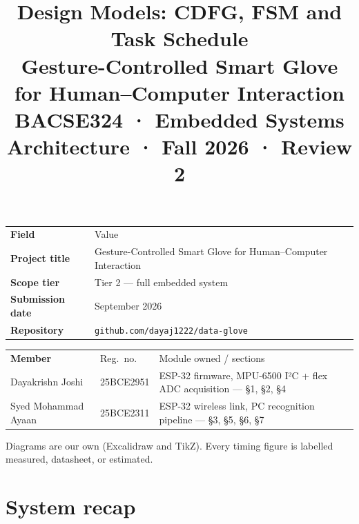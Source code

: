 \documentclass[11pt,a4paper]{article}
\title{\vspace{-1.2cm}\textbf{Design Models: CDFG, FSM and Task Schedule}\\[4pt]
\large Gesture-Controlled Smart Glove for Human–Computer Interaction\\[2pt]
\normalsize BACSE324 · Embedded Systems Architecture · Fall 2026 · Review 2}
\date{}
\newcommand{\hdrow}[1]{\rowcolor{headbg}\color{headfg}\bfseries #1}
\begin{document}
\maketitle
\vspace{-1.0cm}

\begin{tabularx}{\textwidth}{@{}>{\bfseries}p{4.2cm}X@{}}
\hdrow{Field & Value} \\[1pt]
Project title & Gesture-Controlled Smart Glove for Human–Computer Interaction \\
Scope tier & Tier 2 — full embedded system \\
Submission date & September 2026 \\
Repository & \texttt{github.com/dayaj1222/data-glove} \\
\end{tabularx}

\vspace{8pt}
\begin{tabularx}{\textwidth}{@{}p{4.2cm}p{2.6cm}X@{}}
\hdrow{Member & Reg.\ no. & Module owned / sections} \\[1pt]
Dayakrishn Joshi & 25BCE2951 & ESP-32 firmware, MPU-6500 I²C + flex ADC acquisition — §1, §2, §4 \\
Syed Mohammad Ayaan & 25BCE2311 & ESP-32 wireless link, PC recognition pipeline — §3, §5, §6, §7 \\
\end{tabularx}

\vspace{6pt}
{\footnotesize\color{kicker}Diagrams are our own (Excalidraw and TikZ). Every timing figure
is labelled measured, datasheet, or estimated.}

\section{System recap}
\end{document}
